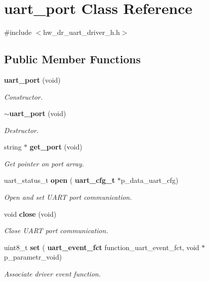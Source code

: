 \section{uart\+\_\+port Class Reference}
\label{classuart__port}


{\ttfamily \#include $<$hw\+\_\+dr\+\_\+uart\+\_\+driver\+\_\+h.\+h$>$}

\subsection*{Public Member Functions}
\begin{DoxyCompactItemize}
\item 
\textbf{ uart\+\_\+port} (void)
\begin{DoxyCompactList}\small\item\em Constructor. \end{DoxyCompactList}\item 
\textbf{ $\sim$uart\+\_\+port} (void)
\begin{DoxyCompactList}\small\item\em Destructor. \end{DoxyCompactList}\item 
string $\ast$ \textbf{ get\+\_\+port} (void)
\begin{DoxyCompactList}\small\item\em Get pointer on port array. \end{DoxyCompactList}\item 
uart\+\_\+status\+\_\+t \textbf{ open} (\textbf{ uart\+\_\+cfg\+\_\+t} $\ast$p\+\_\+data\+\_\+uart\+\_\+cfg)
\begin{DoxyCompactList}\small\item\em Open and set U\+A\+RT port communication. \end{DoxyCompactList}\item 
void \textbf{ close} (void)
\begin{DoxyCompactList}\small\item\em Close U\+A\+RT port communication. \end{DoxyCompactList}\item 
uint8\+\_\+t \textbf{ set} (\textbf{ uart\+\_\+event\+\_\+fct} function\+\_\+uart\+\_\+event\+\_\+fct, void $\ast$p\+\_\+parametr\+\_\+void)
\begin{DoxyCompactList}\small\item\em Associate driver event function. \end{DoxyCompactList}\item 

\end{DoxyCompactItemize}
